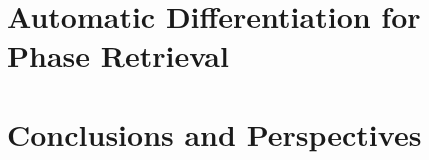 \documentclass[12pt]{book}
\begin{document}
\chapter{Automatic Differentiation for Phase Retrieval}
\label{chap:AD_phase_retrieval}


\chapter{Conclusions and Perspectives}
\label{chap:conclusions}


% 


% 
\printbibliography
{}


% 
\end{document}
